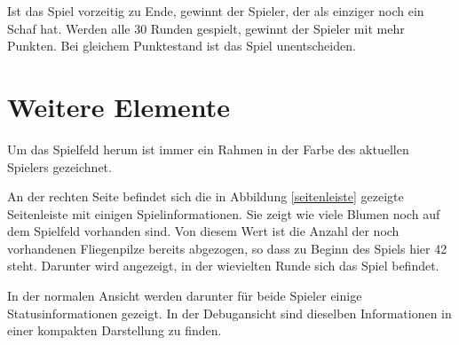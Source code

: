 \documentclass[11pt,pointlessnumbers,DIV10,BCOR10mm,tocleft]{scrreprt}
\begin{document}
Ist das Spiel vorzeitig zu Ende, gewinnt der Spieler, der als einziger noch ein Schaf hat. Werden alle 30 Runden gespielt, gewinnt der Spieler mit mehr Punkten. Bei gleichem Punktestand ist das Spiel unentscheiden.

\section{Weitere Elemente}
Um das Spielfeld herum ist immer ein Rahmen in der Farbe des aktuellen Spielers gezeichnet.

An der rechten Seite befindet sich die in Abbildung \ref{seitenleiste} gezeigte Seitenleiste mit einigen Spielinformationen. Sie zeigt wie viele Blumen noch auf dem Spielfeld vorhanden sind. Von diesem Wert ist die Anzahl der noch vorhandenen Fliegenpilze bereits abgezogen, so dass zu Beginn des Spiels hier 42 steht. Darunter wird angezeigt, in der wievielten Runde sich das Spiel befindet.

In der normalen Ansicht werden darunter für beide Spieler einige Statusinformationen gezeigt. In der Debugansicht sind dieselben Informationen in einer kompakten Darstellung zu finden. 
\end{document}

